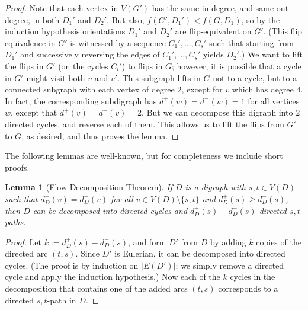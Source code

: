 \documentclass[a4paper,12pt]{article}
\theoremstyle{plain}
\newtheorem{lem}[theorem]{Lemma}
\theoremstyle{definition}
\renewcommand\ge\geqslant
\begin{document}
\begin{proof}
	Note that each vertex in $V(G')$ has the same in-degree, and same out-degree, in both $D_1'$ and $D_2'$.  But also, $f(G',D_1') < f(G,D_1)$, so by the induction hypothesis orientations $D_1'$ and $D_2'$ are flip-equivalent on $G'$. (This flip equivalence in $G'$ is witnessed by a sequence $C_1',\ldots,C_s'$ such that starting from $D_1'$ and successively reversing the edges of $C_1',\ldots,C_s'$ yields $D_2'$.)  
    We want to lift the flips in $G'$ (on the cycles $C_i'$) to flips in $G$; however, it is possible that a cycle in $G'$ might visit both $v$ and $v'$.  This subgraph lifts in $G$ not to a cycle, but to a connected subgraph with each vertex of degree $2$, except for $v$ which has degree $4$. In fact, the corresponding subdigraph has $d^+(w)=d^-(w)=1$ for all vertices $w$, except that $d^+(v)=d^-(v)=2$. But we can decompose this digraph into $2$ directed cycles, and reverse each of them.  This allows us to lift the flips from $G'$ to $G$, as desired, and thus proves the lemma.
\end{proof}

The following lemmas are well-known, but for completeness we include short proofs.

\begin{lem}[Flow Decomposition Theorem]\label{lem:FlowDecomposition}
	If $D$ is a digraph with $s,t\in V(D)$ such that $d^+_D(v) = d^-_D(v)$ for all $v\in V(D)\setminus\{s,t\}$ and $d^+_D(s)\ge d^-_D(s)$, then $D$ can be decomposed into
	directed cycles and $d^+_D(s)-d^-_D(s)$ directed $s,t$-paths.
\end{lem}
\begin{proof}
	Let $k:=d^+_D(s)-d^-_D(s)$, and form $D'$ from $D$ by adding $k$ copies of the directed {arc $(t,s)$}.
	Since $D'$ is Eulerian, it can be decomposed into directed cycles. (The proof is by induction
	on $|E(D')|$; we simply remove a directed cycle and apply the induction hypothesis.)  Now each of
	the $k$ cycles in the decomposition that contains one of the added arcs $(t,s)$ corresponds to a directed $s,t$-path in $D$.
\end{proof}
\end{document}
